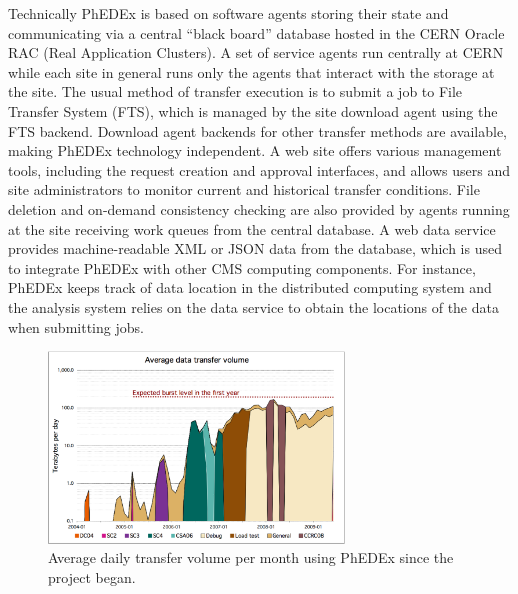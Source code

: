 Technically PhEDEx is based on software agents storing their state and
communicating via a central ``black board'' database hosted in the
CERN Oracle RAC (Real Application Clusters). A set of service agents
run centrally at CERN while each site in general runs
only the agents that interact with the storage at the site. The usual
method of transfer execution is to submit a job to File Transfer System (FTS), 
which is managed by the site download agent using the FTS backend.  Download
agent backends for other transfer methods are available, making PhEDEx
technology independent. A web site offers various management tools,
including the request creation and approval interfaces, and allows
users and site administrators to monitor current and historical
transfer conditions.  File deletion and on-demand consistency checking
are also provided by agents running at the site receiving work queues
from the central database.  A web data service provides
machine-readable XML or JSON data from the database, which is used to
integrate PhEDEx with other CMS computing components.  For instance,
PhEDEx keeps track of data location in the distributed computing
system and the analysis system relies on the data service to obtain
the locations of the data when submitting jobs.

\begin{figure}
 \includegraphics[width=0.70\textwidth]{phedex-avg-monthly-volume.eps}
\caption{Average daily transfer volume per month using PhEDEx since the project began.}
\label{fig:phedex-transfers}
\end{figure}

